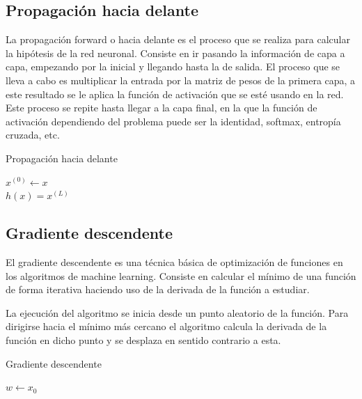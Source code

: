 \subsection{Propagación hacia delante}

La propagación forward o hacia delante es el proceso que se realiza para calcular la hipótesis de la red neuronal. Consiste en ir pasando la información de capa a capa, empezando por la inicial y llegando hasta la de salida. El proceso que se lleva a cabo es multiplicar la entrada por la matriz de pesos de la primera capa, a este resultado se le aplica la función de activación que se esté usando en la red. Este proceso se repite hasta llegar a la capa final, en la que la función de activación dependiendo del problema puede ser la identidad, softmax, entropía cruzada, etc.

\begin{algorithm}[H]
   \caption{Propagación hacia delante}
   
   $x^{(0)} \gets x$ \\
   $h(x) = x^{(L)}$
   \label{tab:Feedforward}
\end{algorithm}

\subsection{Gradiente descendente}

El gradiente descendente es una técnica básica de optimización de funciones en los algoritmos de machine learning. Consiste en calcular el mínimo de una función de forma iterativa haciendo uso de la derivada de la función a estudiar. 

La ejecución del algoritmo se inicia desde un punto aleatorio de la función. Para dirigirse hacia el mínimo más cercano el algoritmo calcula la derivada de la función en dicho punto y se desplaza en sentido contrario a esta. 

\begin{algorithm}[H]
   \caption{Gradiente descendente}
   $w \gets x_{0}$\\
\end{algorithm}
